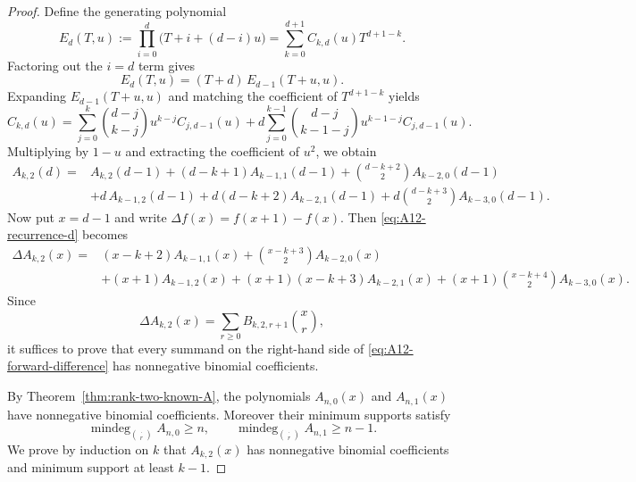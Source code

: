 \documentclass[11pt]{amsart}
\numberwithin{equation}{section}
\theoremstyle{remark}
\begin{document}
\begin{proof}
Define the generating polynomial
\[
  E_d(T,u):=\prod_{i=0}^d \bigl(T+i+(d-i)u\bigr)
  =\sum_{k=0}^{d+1} C_{k,d}(u)T^{d+1-k}.
\]
Factoring out the $i=d$ term gives
\[
  E_d(T,u)=(T+d)\,E_{d-1}(T+u,u).
\]
Expanding $E_{d-1}(T+u,u)$ and matching the coefficient of $T^{d+1-k}$ yields
\[
  C_{k,d}(u)=
  \sum_{j=0}^{k}\binom{d-j}{k-j}u^{k-j}C_{j,d-1}(u)
  +d\sum_{j=0}^{k-1}\binom{d-j}{k-1-j}u^{k-1-j}C_{j,d-1}(u).
\]
Multiplying by $1-u$ and extracting the coefficient of $u^2$, we obtain
\begin{align}
A_{k,2}(d)
={}&A_{k,2}(d-1)+(d-k+1)A_{k-1,1}(d-1)+\binom{d-k+2}{2}A_{k-2,0}(d-1) \nonumber\\
&+d\,A_{k-1,2}(d-1)+d(d-k+2)A_{k-2,1}(d-1)
+d\binom{d-k+3}{2}A_{k-3,0}(d-1). \label{eq:A12-recurrence-d}
\end{align}
Now put $x=d-1$ and write $\Delta f(x)=f(x+1)-f(x)$.  Then \eqref{eq:A12-recurrence-d} becomes
\begin{align}
\Delta A_{k,2}(x)
={}&(x-k+2)A_{k-1,1}(x)+\binom{x-k+3}{2}A_{k-2,0}(x) \nonumber\\
&+(x+1)A_{k-1,2}(x)+(x+1)(x-k+3)A_{k-2,1}(x)
+(x+1)\binom{x-k+4}{2}A_{k-3,0}(x). \label{eq:A12-forward-difference}
\end{align}
Since
\[
  \Delta A_{k,2}(x)=\sum_{r\ge0} B_{k,2,r+1}\binom{x}{r},
\]
it suffices to prove that every summand on the right-hand side of \eqref{eq:A12-forward-difference} has nonnegative binomial coefficients.

By Theorem~\ref{thm:rank-two-known-A}, the polynomials $A_{n,0}(x)$ and $A_{n,1}(x)$ have nonnegative binomial coefficients.  Moreover their minimum supports satisfy
\[
  \operatorname{mindeg}_{\binom{\cdot}{r}}A_{n,0}\ge n,
  \qquad
  \operatorname{mindeg}_{\binom{\cdot}{r}}A_{n,1}\ge n-1.
\]
We prove by induction on $k$ that $A_{k,2}(x)$ has nonnegative binomial coefficients and minimum support at least $k-1$.


\end{proof}
\end{document}
